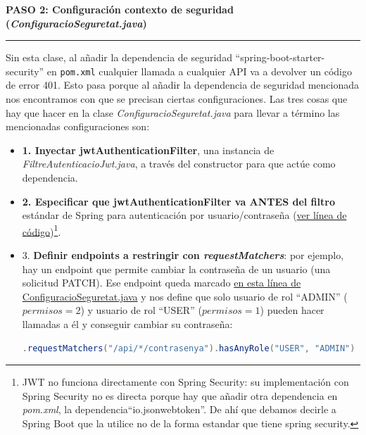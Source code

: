 \documentclass[a4paper,12pt]{report}
\begin{document}
	
	


		\noindent \textbf{PASO 2: Configuración contexto de seguridad (\textit{ConfiguracioSeguretat.java})}
		\hrule
		\vspace{1em}
		
		Sin esta clase, al añadir la dependencia de seguridad ``spring-boot-starter-security'' en \texttt{pom.xml} cualquier llamada a cualquier API va a devolver un código de error 401. Esto pasa porque al añadir la dependencia de seguridad mencionada nos encontramos con que se precisan ciertas configuraciones. Las tres cosas que hay que hacer en la clase \textit{ConfiguracioSeguretat.java} para llevar a término las mencionadas configuraciones son:
		
		
		\begin{itemize}
		\setlength{\itemsep}{-.3em}
		 
		 
		\item \textbf{1. Inyectar jwtAuthenticationFilter}, una instancia de \textit{FiltreAutenticacioJwt.java}, a través del constructor para que actúe como dependencia.
		 
		\item \textbf{2. Especificar que jwtAuthenticationFilter va ANTES del filtro} estándar de Spring para autenticación por usuario/contraseña (\href{https://github.com/blackcub3s/mercApp/blob/db26ff53664be55223c793cf9b52ade87688be45/APP%20WEB/__springboot__produccio__/app/src/main/java/miApp/app/seguretat/ConfiguracioSeguretat.java#L41}{ver línea de código})\footnote{JWT no funciona directamente con Spring Security: su implementación con Spring Security no es directa porque hay que añadir otra dependencia en \textit{pom.xml}, la dependencia``io.jsonwebtoken''. De ahí que debamos decirle a Spring Boot que la utilice no de la forma estandar que tiene spring security.}. 
		
		\item 3. \textbf{Definir endpoints a restringir con \textit{requestMatchers}}: por ejemplo, hay un endpoint que permite cambiar la contraseña de un usuario (una solicitud PATCH). Ese endpoint queda marcado  \href{https://github.com/blackcub3s/mercApp/blob/db26ff53664be55223c793cf9b52ade87688be45/APP%20WEB/__springboot__produccio__/app/src/main/java/miApp/app/seguretat/ConfiguracioSeguretat.java#L34}{en esta línea de ConfiguracioSeguretat.java} y nos define que solo usuario de rol ``ADMIN'' ($permisos = 2$) y usuario de rol ``USER'' ($permisos = 1$) pueden hacer llamadas a él y conseguir cambiar su contraseña:
		
\begin{lstlisting}[language=java, basicstyle=\ttfamily\footnotesize, keywordstyle=\color{magenta}]
.requestMatchers("/api/*/contrasenya").hasAnyRole("USER", "ADMIN")
\end{lstlisting}


		\end{itemize}
\end{document}
